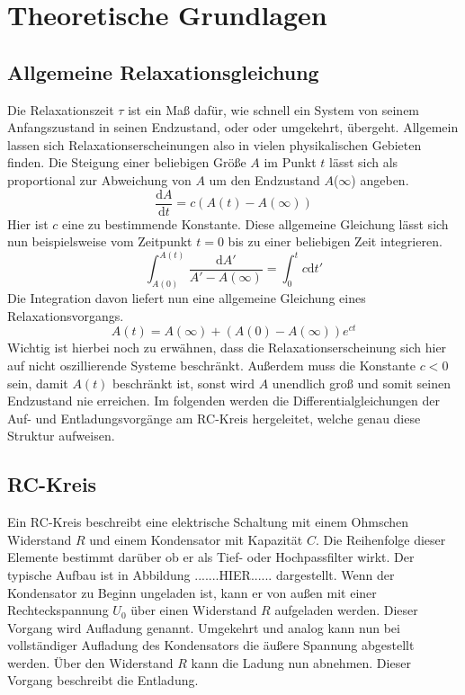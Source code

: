 \section{Theoretische Grundlagen}
\subsection{Allgemeine Relaxationsgleichung}
Die Relaxationszeit $\tau$ ist ein Maß dafür, wie schnell ein System von seinem Anfangszustand in seinen Endzustand, oder oder umgekehrt, übergeht. Allgemein lassen sich Relaxationserscheinungen also in vielen physikalischen Gebieten finden.
Die Steigung einer beliebigen Größe $A$ im Punkt $t$ lässt sich als proportional zur Abweichung von $A$ um den Endzustand $A$($\infty$) angeben.
\begin{equation}
    \frac{\text{d}A}{\text{d}t} =  c (A(t) - A(\infty))
\end{equation}
Hier ist $c$ eine zu bestimmende Konstante.
Diese allgemeine Gleichung lässt sich nun beispielsweise vom Zeitpunkt $t=0$ bis zu einer beliebigen Zeit integrieren.
\begin{equation}
    \int_{A(0)}^{A(t)} \frac{\text{d}A'}{A' - A(\infty)} = \int_{0}^{t} c \text{d}t'
\end{equation}
Die Integration davon liefert nun eine allgemeine Gleichung eines Relaxationsvorgangs.
\begin{equation}
    A(t) = A(\infty) + (A(0) - A(\infty))e^{ct}
\end{equation}
Wichtig ist hierbei noch zu erwähnen, dass die Relaxationserscheinung sich hier auf nicht oszillierende Systeme beschränkt.
Außerdem muss die Konstante $c < 0$ sein, damit $A(t)$ beschränkt ist, sonst wird $A$ unendlich groß und somit seinen Endzustand nie erreichen.
Im folgenden werden die Differentialgleichungen der Auf- und Entladungsvorgänge am RC-Kreis hergeleitet, welche genau diese Struktur aufweisen.
\subsection{RC-Kreis}
Ein RC-Kreis beschreibt eine elektrische Schaltung mit einem Ohmschen Widerstand $R$ und einem Kondensator mit Kapazität $C$. Die Reihenfolge dieser Elemente bestimmt darüber ob er als Tief- oder Hochpassfilter wirkt. Der typische Aufbau ist in Abbildung .......HIER...... dargestellt. Wenn der Kondensator zu Beginn ungeladen ist, kann er von außen mit einer Rechteckspannung $U_{0}$ über einen Widerstand $R$ aufgeladen werden. Dieser Vorgang wird Aufladung genannt. Umgekehrt und analog kann nun bei vollständiger Aufladung des Kondensators die äußere Spannung abgestellt werden. Über den Widerstand $R$ kann die Ladung nun abnehmen. Dieser Vorgang beschreibt die Entladung.
